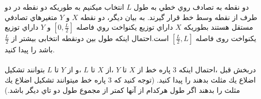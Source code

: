 \problem{}
\subproblem{} دو نقطه به تصادف روي خطي به طول 
$L$ انتخاب ميكنيم به طوريكه دو نقطه در دو
طرف از نقطه وسط خط قرار گيرند. به بيان ديگر، دو نقطه $X$ و $Y$ متغيرهاي تصادفي مستقل هستند بطوريكه $X$ داراي توزيع يكنواخت روي فاصله $[0,\frac{L}{2}]$ و $Y$ داراي توزيع
يكنواخت روی فاصله $[\frac{L}{2},L]$ است.احتمال اينكه طول بين دونقطه انتخابی بيشتر از  $\frac{L}{2}$
باشد را پيدا كنيد.\\
\\
\subproblem{}
 دربخش قبل ،احتمال اينكه $3$ پاره خط از $X$ تا $Y$ ،از $X$  تا $L$ ،و از $Y$ تا $L$ بتوانند تشكيل اضلاع يك مثلث بدهند را پيدا كنيد. 
 (توجه كنيد كه $3$ پاره خط ميتوانند تشكيل اضلاع
يك مثلث را بدهند اگر طول هركدام از آنها كمتر از مجموع طول دو تاي ديگر باشد.)